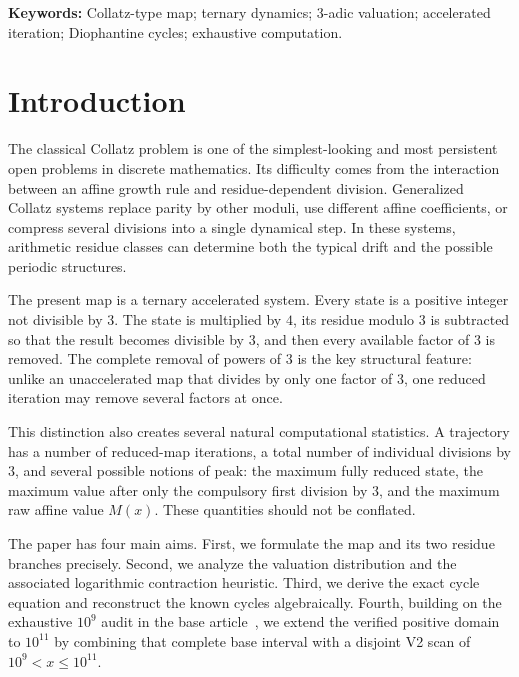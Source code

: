 \documentclass[11pt]{article}
\newcommand{\Mmap}{M}
\begin{document}
\noindent\textbf{Keywords:} Collatz-type map; ternary dynamics; 3-adic valuation; accelerated iteration; Diophantine cycles; exhaustive computation.

\section{Introduction}
The classical Collatz problem is one of the simplest-looking and most persistent open problems in discrete mathematics.  Its difficulty comes from the interaction between an affine growth rule and residue-dependent division.  Generalized Collatz systems replace parity by other moduli, use different affine coefficients, or compress several divisions into a single dynamical step.  In these systems, arithmetic residue classes can determine both the typical drift and the possible periodic structures.

The present map is a ternary accelerated system.  Every state is a positive integer not divisible by $3$.  The state is multiplied by $4$, its residue modulo $3$ is subtracted so that the result becomes divisible by $3$, and then every available factor of $3$ is removed.  The complete removal of powers of $3$ is the key structural feature: unlike an unaccelerated map that divides by only one factor of $3$, one reduced iteration may remove several factors at once.

This distinction also creates several natural computational statistics.  A trajectory has a number of reduced-map iterations, a total number of individual divisions by $3$, and several possible notions of peak: the maximum fully reduced state, the maximum value after only the compulsory first division by $3$, and the maximum raw affine value $\Mmap(x)$.  These quantities should not be conflated.

The paper has four main aims.  First, we formulate the map and its two residue branches precisely.  Second, we analyze the valuation distribution and the associated logarithmic contraction heuristic.  Third, we derive the exact cycle equation and reconstruct the known cycles algebraically.  Fourth, building on the exhaustive $10^9$ audit in the base article~\cite{banazadeh2026base}, we extend the verified positive domain to $10^{11}$ by combining that complete base interval with a disjoint V2 scan of $10^9<x\le10^{11}$.
\end{document}
